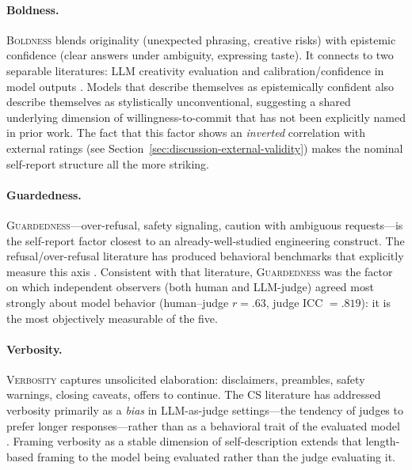 \documentclass[11pt]{article}
\newcommand{\factorname}[1]{\textsc{#1}}
\begin{document}
\paragraph{Boldness.}
\factorname{Boldness} blends originality (unexpected phrasing, creative risks) with epistemic confidence (clear answers under ambiguity, expressing taste).
It connects to two separable literatures: LLM creativity evaluation \citep{chakrabarty2024artartificelargelanguage, Franceschelli_2024} and calibration/confidence in model outputs \citep{kadavath2022languagemodelsmostlyknow, yang2026calibrationlargelanguagemodels}.
Models that describe themselves as epistemically confident also describe themselves as stylistically unconventional, suggesting a shared underlying dimension of willingness-to-commit that has not been explicitly named in prior work.
The fact that this factor shows an \emph{inverted} correlation with external ratings (see Section~\ref{sec:discussion-external-validity}) makes the nominal self-report structure all the more striking.

\paragraph{Guardedness.}
\factorname{Guardedness}---over-refusal, safety signaling, caution with ambiguous requests---is the self-report factor closest to an already-well-studied engineering construct.
The refusal/over-refusal literature has produced behavioral benchmarks that explicitly measure this axis \citep{rottger2024xstesttestsuiteidentifying, cui2025orbenchoverrefusalbenchmarklarge}.
Consistent with that literature, \factorname{Guardedness} was the factor on which independent observers (both human and LLM-judge) agreed most strongly about model behavior (human--judge $r = .63$, judge ICC $= .819$): it is the most objectively measurable of the five.

\paragraph{Verbosity.}
\factorname{Verbosity} captures unsolicited elaboration: disclaimers, preambles, safety warnings, closing caveats, offers to continue.
The CS literature has addressed verbosity primarily as a \emph{bias} in LLM-as-judge settings---the tendency of judges to prefer longer responses---rather than as a behavioral trait of the evaluated model \citep{zheng2023judging, saito2023verbositybiaspreferencelabeling, dubois2025lengthcontrolledalpacaevalsimpleway}.
Framing verbosity as a stable dimension of self-description extends that length-based framing to the model being evaluated rather than the judge evaluating it.
\end{document}
